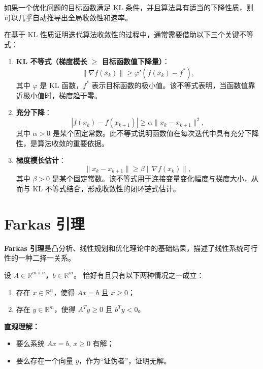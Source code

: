 \begin{remark}
如果一个优化问题的目标函数满足 KL 条件，并且算法具有适当的下降性质，则可以几乎自动推导出全局收敛性和速率。
\end{remark}
在基于 KL 性质证明迭代算法收敛性的过程中，通常需要借助以下三个关键不等式：

\begin{enumerate}
    \item \textbf{KL 不等式（梯度模长 $\geq$ 目标函数值下降量）}：
    \[
    \|\nabla f(x_k)\| \geq \varphi'\left(f(x_k) - f^*\right),
    \]
    其中 $\varphi$ 是 KL 函数，$f^*$ 表示目标函数的极小值。该不等式表明，当函数值靠近极小值时，梯度趋于零。
    
    \item \textbf{充分下降}：
    \[
    |f(x_k) - f(x_{k+1})| \geq \alpha \|x_k - x_{k+1}\|^2,
    \]
    其中 $\alpha > 0$ 是某个固定常数。此不等式说明函数值在每次迭代中具有充分下降性，是算法收敛的重要依据。
    
    \item \textbf{梯度模长估计}：
    \[
    \|x_k - x_{k+1}\| \geq \beta \|\nabla f(x_k)\|,
    \]
    其中 $\beta > 0$ 是某个固定常数。该不等式用于连接变量变化幅度与梯度大小，从而与 KL 不等式结合，形成收敛性的闭环链式估计。
\end{enumerate}
\newpage
\section{Farkas 引理}
\textbf{Farkas 引理}是凸分析、线性规划和优化理论中的基础结果，描述了线性系统可行性的一种二择一关系。

\begin{lemma}
	设 $A \in \mathbb{R}^{m\times n}$，$b \in \mathbb{R}^m$。  
	恰好有且只有以下两种情况之一成立：
	\begin{enumerate}
		\item 存在 $x \in \mathbb{R}^n$，使得 $Ax = b$ 且 $x \geq 0$；
		\item 存在 $y \in \mathbb{R}^m$，使得 $A^T y \geq 0$ 且 $b^T y < 0$。
	\end{enumerate}
\end{lemma}

\textbf{直观理解：}
\begin{itemize}
	\item 要么系统 $Ax = b$, $x \geq 0$ 有解；
	\item 要么存在一个向量 $y$，作为“证伪者”，证明无解。
\end{itemize}

